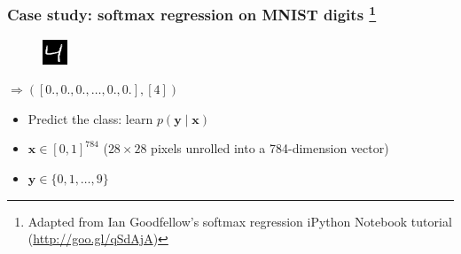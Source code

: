 \documentclass[mathserif, xcolor=dvipsnames]{beamer}
\begin{document}
\begin{frame}[t]
    \frametitle{Case study: softmax regression on MNIST digits
                \footnote{Adapted from Ian Goodfellow's softmax regression
                          iPython Notebook tutorial (\url{http://goo.gl/qSdAjA})}}

    \begin{center}
    \begin{minipage}{0.05\textwidth}
    \begin{figure}[H]
        \raggedleft
        \includegraphics[width=\textwidth]{mnist_4.png}
    \end{figure}
    \end{minipage}
    \begin{minipage}{0.9\textwidth}
        \raggedright
        $\Rightarrow ([0., 0., 0., \ldots, 0., 0.],
                      [4])$
    \end{minipage}
    \end{center}

    \begin{itemize}\addtolength{\itemsep}{2.0\baselineskip}
        \item{Predict the class: learn $p(\mathbf{y} \mid \mathbf{x})$}
        \item{$\mathbf{x} \in [0, 1]^{784}$ ($28 \times 28$ pixels unrolled
              into a 784-dimension vector)}
        \item{$\mathbf{y} \in \{0, 1, \ldots, 9\}$}
    \end{itemize}
\end{frame}
\end{document}
